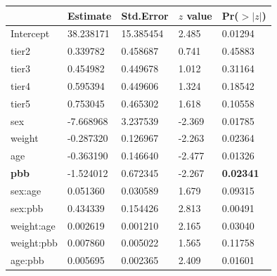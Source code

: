 \documentclass{article}
\begin{document}
\begin{enumerate}[leftmargin = 0 em, label = \arabic*., font = \bfseries]
\begin{enumerate}
		\begin{center}
		\begin{tabular}{lllll}
		 \toprule
         		    &Estimate &Std.Error &$z$ value& Pr($>|z|$)\\
         		    \midrule   
        Intercept   &38.238171  &15.385454  & 2.485  &0.01294\\ 
        tier2       & 0.339782  & 0.458687  & 0.741  &0.45883\\ 
        tier3       & 0.454982  & 0.449678  & 1.012  &0.31164\\ 
        tier4       & 0.595394  & 0.449606  & 1.324  &0.18542\\ 
        tier5       & 0.753045  & 0.465302  & 1.618  &0.10558\\ 
        sex         &-7.668968  & 3.237539  &-2.369  &0.01785\\ 
        weight      &-0.287320  & 0.126967  &-2.263  &0.02364\\ 
        age         &-0.363190  & 0.146640  &-2.477  &0.01326\\ 
        \textbf{pbb}         &-1.524012  & 0.672345  &-2.267  &\textbf{0.02341}\\ 
        sex:age     & 0.051360  & 0.030589  & 1.679  &0.09315\\ 
        sex:pbb     & 0.434339  & 0.154426  & 2.813  &0.00491\\ 
        weight:age  & 0.002619  & 0.001210  & 2.165  &0.03040\\ 
        weight:pbb  & 0.007860  & 0.005022  & 1.565  &0.11758\\ 
        age:pbb     & 0.005695  & 0.002365  & 2.409  &0.01601\\ 
         \bottomrule
		\end{tabular}
		\end{center}  


\end{enumerate}
\end{enumerate}
\end{document}
